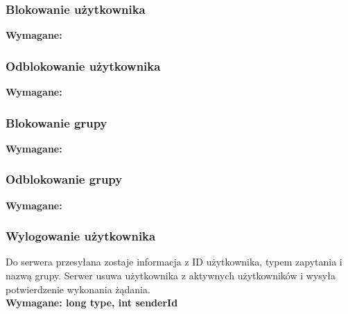 \documentclass[11pt]{article}
\begin{document}
	\subsubsection{Blokowanie użytkownika}
	\textbf{Wymagane:}
	\subsubsection{Odblokowanie użytkownika}
	\textbf{Wymagane:}
	\subsubsection{Blokowanie grupy}
	\textbf{Wymagane:}
	\subsubsection{Odblokowanie grupy}
	\textbf{Wymagane:}
	\subsubsection{Wylogowanie użytkownika}
	Do serwera przesyłana zostaje informacja z ID użytkownika, typem zapytania i nazwą grupy. Serwer usuwa użytkownika z aktywnych użytkowników i wysyła potwierdzenie wykonania żądania.\\
	\textbf{Wymagane: long type, int senderId}
	
\end{document}
